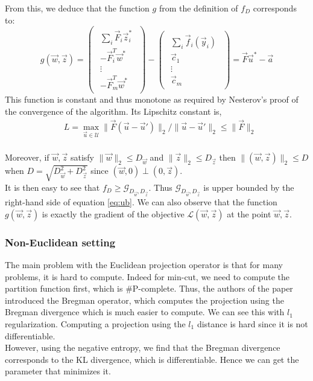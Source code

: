 \documentclass{article}
\begin{document}
From this, we deduce that the function $g$ from the definition of $f_D$ corresponds to:
\begin{equation}
  g(\vec w, \vec z) =
  \begin{pmatrix}
    \begin{array}{c}
      \sum_i \vec F_i \vec z_i^*\\
      - \vec F_i^T \vec w^*\\
      \vdots\\
      - \vec F_m^T \vec w^*
    \end{array}
  \end{pmatrix} -
  \begin{pmatrix}
    \begin{array}{c}
      \sum_i \vec f_i (\vec y_i)\\
      \vec c_1\\
      \vdots\\
      \vec c_m
    \end{array}
  \end{pmatrix} = \vec F \vec u^* - \vec a
\end{equation}
This function is constant and thus monotone as required by Nesterov's proof of the convergence of the algorithm. Its Lipschitz constant is,
\begin{equation*}
\begin{aligned}
    &L= \max_{\vec u \in \mathcal{U}} \lVert \vec F (\vec u - \vec u') \rVert_2 / \lVert \vec u - \vec u' \rVert_2 \leq \lVert \vec F \rVert_2 
\end{aligned}
\end{equation*}
\\
Moreover, if $\vec w, \vec z$ satisfy $\lVert \vec w \rVert_2 \leq D_{\vec w}$ and $\lVert \vec z \rVert_2 \leq D_{\vec z}$ then $\lVert (\vec w, \vec z) \rVert_2 \leq D$ when $D = \sqrt{D_{\vec w}^2 + D_{\vec z}^2}$ since $(\vec w, 0) \perp (0, \vec z)$.\\
It is then easy to see that $f_D \geq \mathcal{G}_{D_{\vec w}, D_{\vec z}}$. Thus $\mathcal{G}_{D_{\vec w}, D_{\vec z}}$ is upper bounded by the right-hand side of equation \ref{eq:ub}. We can also observe that the function $g(\vec w, \vec z)$ is exactly the gradient of the objective $\mathcal{L}(\vec w, \vec z)$ at the point $\vec w, \vec z$.

\subsubsection{Non-Euclidean setting}
The main problem with the Euclidean projection operator is that for many
problems, it is hard to compute. Indeed for min-cut, we need to
compute the partition function first, which is \#P-complete. Thus, the authors
of the paper introduced the Bregman operator, which computes the projection
using the Bregman divergence which is much easier to compute. We can see this with $l_{1}$ regularization. Computing a
projection using the $l_{1}$ distance is hard since it is not differentiable.\\
However, using the negative entropy, we find that the Bregman divergence corresponds to the KL divergence, which is differentiable. Hence we can get the parameter that minimizes it.
\end{document}
